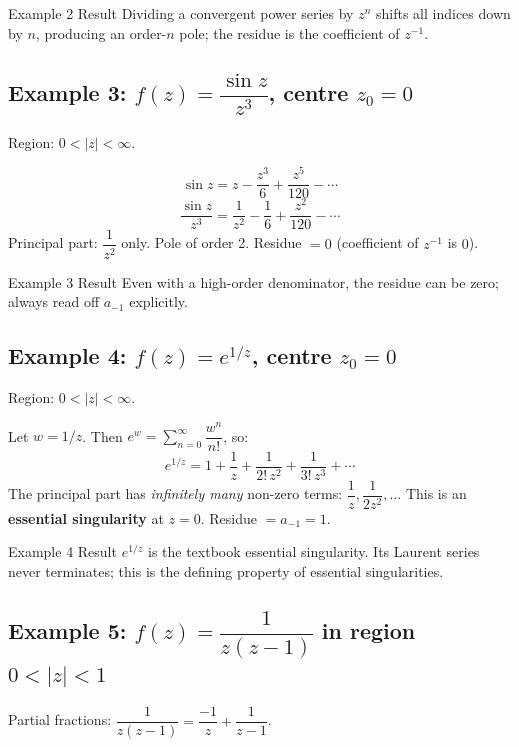 \documentclass[12pt,a4paper]{article}
\begin{document}
\begin{learnbox}{Example 2 Result}
Dividing a convergent power series by $z^n$ shifts all indices down by $n$, producing an order-$n$ pole; the residue is the coefficient of $z^{-1}$.
\end{learnbox}

\subsection*{Example 3: $f(z)=\dfrac{\sin z}{z^3}$, centre $z_0=0$}

Region: $0 < |z| < \infty$.

\[
  \sin z = z - \frac{z^3}{6} + \frac{z^5}{120} - \cdots
\]
\[
  \frac{\sin z}{z^3} = \frac{1}{z^2} - \frac{1}{6} + \frac{z^2}{120} - \cdots
\]
Principal part: $\dfrac{1}{z^2}$ only. Pole of order 2. Residue $= 0$ (coefficient of $z^{-1}$ is $0$).

\begin{learnbox}{Example 3 Result}
Even with a high-order denominator, the residue can be zero; always read off $a_{-1}$ explicitly.
\end{learnbox}

\subsection*{Example 4: $f(z)=e^{1/z}$, centre $z_0=0$}

Region: $0 < |z| < \infty$.

Let $w=1/z$. Then $e^w = \sum_{n=0}^{\infty} \dfrac{w^n}{n!}$, so:
\[
  e^{1/z} = 1 + \frac{1}{z} + \frac{1}{2!\,z^2} + \frac{1}{3!\,z^3} + \cdots
\]
The principal part has \emph{infinitely many} non-zero terms: $\dfrac{1}{z}, \dfrac{1}{2z^2}, \ldots$
This is an \textbf{essential singularity} at $z=0$. Residue $= a_{-1} = 1$.

\begin{learnbox}{Example 4 Result}
$e^{1/z}$ is the textbook essential singularity. Its Laurent series never terminates; this is the defining property of essential singularities.
\end{learnbox}

\subsection*{Example 5: $f(z)=\dfrac{1}{z(z-1)}$ in region $0<|z|<1$}

Partial fractions: $\dfrac{1}{z(z-1)} = \dfrac{-1}{z} + \dfrac{1}{z-1}$.
\end{document}
